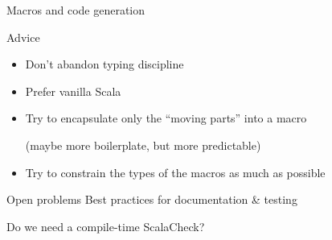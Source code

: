 \documentclass{beamer}
\begin{document}
\begin{frame}{Macros and code generation}
  \begin{block}{Advice}
    \begin{itemize}
      \item Don't abandon typing discipline
      \item Prefer vanilla Scala
      \item Try to encapsulate only the ``moving parts'' into a macro

        (maybe more boilerplate, but more predictable)
      \item Try to constrain the types of the macros as much as possible
    \end{itemize}
  \end{block}
  \vspace{1em}

  \begin{block}{Open problems}
    Best practices for documentation \& testing
    \vspace{1em}

    Do we need a compile-time ScalaCheck?
  \end{block}
\end{frame}

\begin{frame}
\vskip40pt
\begin{center}
\end{center}
\end{frame}

\begin{frame}
\vskip40pt
\begin{center}
\end{center}
\end{frame}
\end{document}
